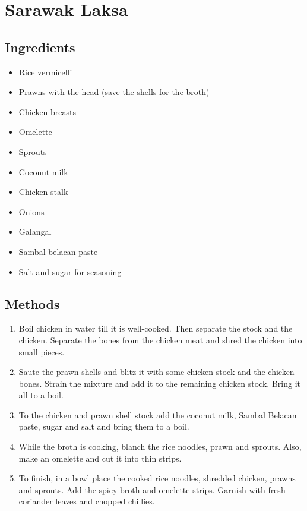 \section{Sarawak Laksa}

\subsection{Ingredients}
\begin{itemize}
	\item Rice vermicelli
	\item Prawns with the head (save the shells for the broth)
	\item Chicken breasts
	\item Omelette
	\item Sprouts
	\item Coconut milk
	\item Chicken stalk
	\item Onions
	\item Galangal
	\item Sambal belacan paste
	\item Salt and sugar for seasoning
\end{itemize}

\subsection{Methods}
\begin{enumerate}
\item Boil chicken in water till it is well-cooked. Then separate the stock and the chicken. Separate the bones from the chicken meat and shred the chicken into small pieces.
\item Saute the prawn shells and blitz it with some chicken stock and the chicken bones. Strain the mixture and add it to the remaining chicken stock. Bring it all to a boil.
\item To the chicken and prawn shell stock add the coconut milk, Sambal Belacan paste, sugar and salt and bring them to a boil.
\item While the broth is cooking, blanch the rice noodles, prawn and sprouts. Also, make an omelette and cut it into thin strips.
\item To finish, in a bowl place the cooked rice noodles, shredded chicken, prawns and sprouts. Add the spicy broth and omelette strips. Garnish with fresh coriander leaves and chopped chillies.
\end{enumerate}

